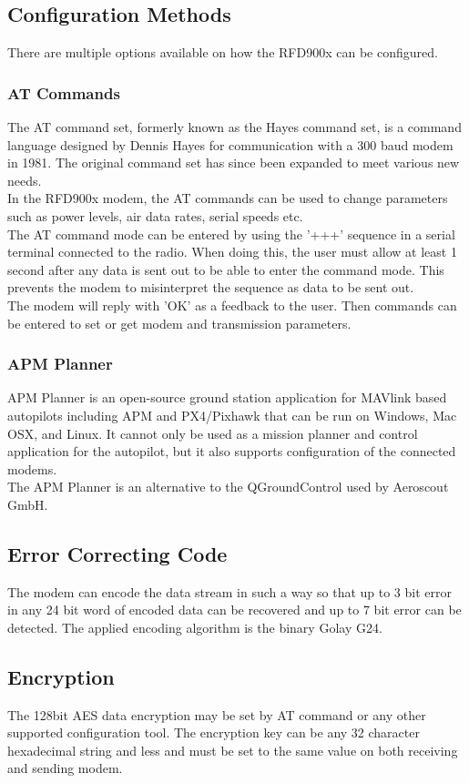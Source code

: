 \subsection{Configuration Methods}
There are multiple options available on how the RFD900x can be configured.
%
\subsubsection{AT Commands}
The AT command set, formerly known as the Hayes command set, is a command language designed by Dennis Hayes for communication with a 300 baud modem in 1981. The original command set has since been expanded to meet various new needs.\\
In the RFD900x modem, the AT commands can be used to change parameters such as power levels, air data rates, serial speeds etc. \\
The AT command mode can be entered by using the '+++' sequence in a serial terminal connected to the radio. When doing this, the user must allow at least 1 second after any data is sent out to be able to enter the command mode. This prevents the modem to misinterpret the sequence as data to be sent out.\\
The modem will reply with 'OK' as a feedback to the user. Then commands can be entered to set or get modem and transmission parameters.
%
\subsubsection{APM Planner}
APM Planner is an open-source ground station application for MAVlink based autopilots including APM and PX4/Pixhawk that can be run on Windows, Mac OSX, and Linux. It cannot only be used as a mission planner and control application for the autopilot, but it also supports configuration of the connected modems.\\
The APM Planner is an alternative to the QGroundControl used by Aeroscout GmbH.
%
%
\subsection{Error Correcting Code}
The modem can encode the data stream in such a way so that up to 3 bit error in any 24 bit word of encoded data can be recovered and up to 7 bit error can be detected. The applied encoding algorithm is the binary Golay G24.
%
%
\subsection{Encryption}
The 128bit AES data encryption may be set by AT command or any other supported configuration tool. The encryption key can be any 32 character hexadecimal string and less and must be set to the same value on both receiving and sending modem. 
%
%
